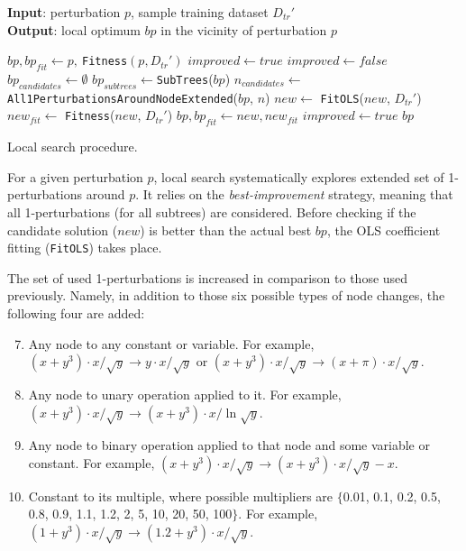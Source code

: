 \documentclass{bmcart}
\begin{document}
\begin{algorithm}
	\hspace*{\algorithmicindent} \textbf{Input}: perturbation $p$, sample training dataset $D_{tr}'$ \\
	\hspace*{\algorithmicindent} \textbf{Output}: local optimum $bp$ in the vicinity of perturbation $p$
	\begin{algorithmic}[1] 
		\State $bp, bp_{fit} \gets p,\ $\texttt{Fitness}$(p,D_{tr}')$ 
		\State $improved \gets true$
		\State $improved \gets false$
		\State $bp_{candidates} \gets \emptyset$
		\State $bp_{subtrees} \gets $\texttt{SubTrees}($bp$)
		\State $n_{candidates} \gets $ \texttt{All1PerturbationsAroundNodeExtended}($bp$, $n$)
		\State $new \gets$ \texttt{FitOLS}($new$, $D_{tr}'$)
		\State $new_{fit} \gets$ \texttt{Fitness}($new$, $D_{tr}'$)
		\State $bp, bp_{fit} \gets new, new_{fit}$
		\State $improved \gets true$
		\EndIf
		\EndFor
		\EndFor
		\EndWhile
		\State \Return $bp$
		\EndProcedure
	\end{algorithmic}
	\caption{Local search procedure.}
	\label{alg:ls}
\end{algorithm}  

For a given perturbation $p$, local search systematically explores extended set of 1-perturbations around $p$. It relies on the \emph{best-improvement} strategy, meaning that all 1-perturbations (for all subtrees) are considered. Before checking if the candidate solution ($new$) is better than the actual best $bp$, the OLS coefficient fitting (\texttt{FitOLS}) takes place.  


The set of used 1-perturbations is increased in comparison to those used previously. Namely, in addition to those six possible types of node changes, the following four are added:

\begin{enumerate}
	\setcounter{enumi}{6}
	\item Any node to any constant or variable. For example, $(x+y^3)\cdot x/\sqrt{y} \rightarrow y \cdot x / \sqrt{y}$ or  $(x+y^3)\cdot x/\sqrt{y} \rightarrow (x+\pi) \cdot x / \sqrt{y}$.
	\item Any node to unary operation applied to it. For example, $(x+y^3)\cdot x/\sqrt{y} \rightarrow (x+y^3)\cdot x/\ln{\sqrt{y}}$.
	\item Any node to binary operation applied to that node and some variable or constant. For example, $(x+y^3)\cdot x/\sqrt{y} \rightarrow (x+y^3)\cdot x/\sqrt{y} - x$.
	\item Constant to its multiple, where possible multipliers are $\{$0.01, 0.1, 0.2, 0.5, 0.8, 0.9, 1.1, 1.2, 2, 5, 10, 20, 50, 100$\}$. For example, $(1+y^3)\cdot x/\sqrt{y} \rightarrow (1.2+y^3)\cdot x/\sqrt{y}$.
\end{enumerate}
\end{document}
